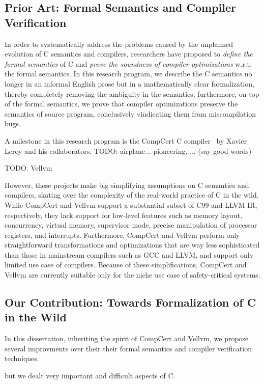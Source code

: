 \subsection{Prior Art: Formal Semantics and Compiler Verification}

In order to systematically address the problems caused by the unplanned evolution of C semantics and
compilers, researchers have proposed to \emph{define the formal semantics} of C and \emph{prove the
  soundness of compiler optimizations} w.r.t. the formal semantics.  In this research program, we
describe the C semantics no longer in an informal English prose but in a mathematically clear
formalization, thereby completely removing the ambiguity in the semantics; furthermore, on top of
the formal semantics, we prove that compiler optimizations preserve the semantics of source program,
conclusively vindicating them from miscompilation bugs.

A milestone in this research program is the CompCert C compiler~\cite{compcert} by Xavier Leroy and
his collaborators.  TODO: airplane...  pioneering, ... (say good words)

TODO: Vellvm

However, these projects make big simplifying assumptions on C semantics and compilers, skating over
the complexity of the real-world practice of C in the wild.  While CompCert and Vellvm support a
substantial subset of C99 and LLVM IR, respectively, they lack support for low-level features such
as memory layout, concurrency, virtual memory, supervisor mode, precise manipulation of processor
registers, and interrupts.  Furthermore, CompCert and Vellvm perform only straightforward
transformations and optimizations that are way less sophisticated than those in mainstream compilers
such as GCC and LLVM, and support only limited use case of compilers.  Because of these
simplifications, CompCert and Vellvm are currently suitable only for the niche use case of
safety-critical systems.


\subsection{Our Contribution: Towards Formalization of C in the Wild}

In this dissertation, inheriting the spirit of CompCert and Vellvm, we propose several improvments
over their their formal semantics and compiler verification techniques.

but we dealt very important and difficult aspects of C.

